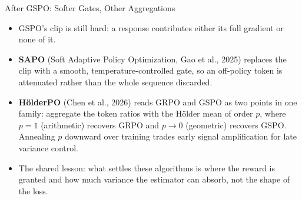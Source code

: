 \begin{frame}{After GSPO: Softer Gates, Other Aggregations}
  \begin{itemize}\itemsep0.4em
    \item[\textcolor{red}{$\blacktriangleright$}] GSPO's clip is still hard: a response contributes either its full gradient or none of it.
    \item[\textcolor{red}{$\blacktriangleright$}] \textbf{SAPO} (Soft Adaptive Policy Optimization, Gao et al., 2025) replaces the clip with a smooth, temperature-controlled gate, so an off-policy token is attenuated rather than the whole sequence discarded.
    \item[\textcolor{red}{$\blacktriangleright$}] \textbf{H\"olderPO} (Chen et al., 2026) reads GRPO and GSPO as two points in one family: aggregate the token ratios with the H\"older mean of order $p$, where $p=1$ (arithmetic) recovers GRPO and $p \to 0$ (geometric) recovers GSPO. Annealing $p$ downward over training trades early signal amplification for late variance control.
    \item[\textcolor{red}{$\blacktriangleright$}] The shared lesson: what settles these algorithms is where the reward is granted and how much variance the estimator can absorb, not the shape of the loss.
  \end{itemize}
\end{frame}
